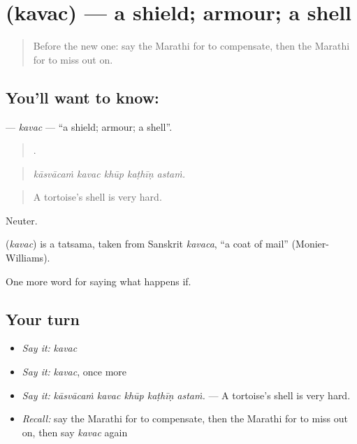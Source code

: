 \section[\texorpdfstring{\mr{कवच} (kavac)}{कवच (kavac)}]{ (kavac) — a shield; armour; a shell}

\label{lesson:MR-C549-kavac}



\begin{quote}
Before the new one: say the Marathi for to compensate, then the Marathi for to miss out on.
\end{quote}

\subsection*{You'll want to know: }
\textbf{} — \emph{kavac} — \textquotedblleft{}a shield; armour; a shell\textquotedblright{}.

\begin{quote}
    .
\end{quote}

\begin{quote}
\emph{kāsvācaṁ kavac khūp kaṭhīṇ astaṁ.}
\end{quote}

\begin{quote}
A tortoise's shell is very hard.
\end{quote}

Neuter.

\begin{cousinweb}
\textbf{} (\emph{kavac}) is a tatsama, taken from Sanskrit \emph{kavaca}, \textquotedblleft{}a coat of mail\textquotedblright{} (Monier-Williams).
\end{cousinweb}

\begin{grammarlens}[title={What you've built}]
One more word for saying what happens if.
\end{grammarlens}

\subsection*{Your turn}
\begin{itemize}
\raggedright
  \item \emph{Say it:} \emph{kavac}
  \item \emph{Say it:} \emph{kavac}, once more
  \item \emph{Say it:} \emph{kāsvācaṁ kavac khūp kaṭhīṇ astaṁ.} — A tortoise's shell is very hard.
  \item \emph{Recall:} say the Marathi for to compensate, then the Marathi for to miss out on, then say \emph{kavac} again
\end{itemize}

